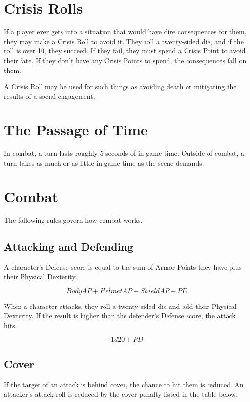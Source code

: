 \begin{multicols}{2}
\section{Crisis Rolls}

If a player ever gets into a situation that would have dire 
consequences for them, they may make a Crisis Roll to avoid it. 
They roll a twenty-sided die, and if the roll is over 10, they 
succeed. If they fail, they must spend a Crisis Point to avoid 
their fate. If they don't have any Crisis Points to spend, the 
consequences fall on them.

A Crisis Roll may be used for such things as avoiding death or 
mitigating the results of a social engagement.

\section{The Passage of Time}

In combat, a turn lasts roughly 5 seconds of in-game time. Outside 
of combat, a turn takes as much or as little in-game time as the 
scene demands.

\section{Combat}

The following rules govern how combat works.

\subsection{Attacking and Defending}

A character's Defense score is equal to the sum of Armor Points they have plus
their Physical Dexterity.

$$Body AP + Helmet AP + Shield AP + PD$$

When a character attacks, they roll a twenty-sided die and add their Physical 
Dexterity. If the result is higher than the defender's Defense score, the attack hits.

$$1d20 + PD$$

\subsection{Cover}

If the target of an attack is behind cover, the chance to hit them is reduced.
An attacker's attack roll is reduced by the cover penalty listed in the table
below.


\end{multicols}
